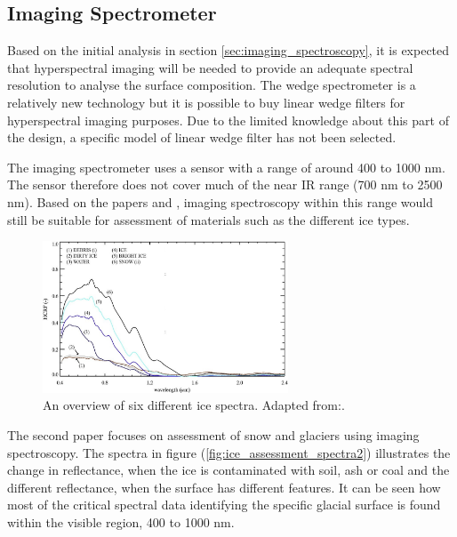 \subsection{Imaging Spectrometer}
Based on the initial analysis in section \ref{sec:imaging_spectroscopy}, it is expected that hyperspectral imaging will be needed to provide an adequate spectral resolution to analyse the surface composition. The wedge spectrometer is a relatively new technology but it is possible to buy linear wedge filters for hyperspectral imaging purposes. Due to the limited knowledge about this part of the design, a specific model of linear wedge filter has not been selected.

The imaging spectrometer uses a sensor with a range of around 400 to 1000 nm. The sensor therefore does not cover much of the near IR range (700 nm to 2500 nm). Based on the papers \cite{naegeli2015a} and \cite{negi2015a}, imaging spectroscopy within this range would still be suitable for assessment of materials such as the different ice types.
\begin{figure}[h!]
\centering
\includegraphics[width=0.65\textwidth]{figures/Orbiter/ice_surface_assessment_spectra}
\caption{An overview of six different ice spectra. Adapted from:\cite{naegeli2015a}.}
\label{fig:ice_assessment_spectra}
\end{figure}
The second paper focuses on assessment of snow and glaciers using imaging spectroscopy\cite{negi2015a}. The spectra in figure (\ref{fig:ice_assessment_spectra2}) illustrates the change in reflectance, when the ice is contaminated with soil, ash or coal and the different reflectance, when the surface has different features. It can be seen how most of the critical spectral data identifying the specific glacial surface is found within the visible region, 400 to 1000 nm.
